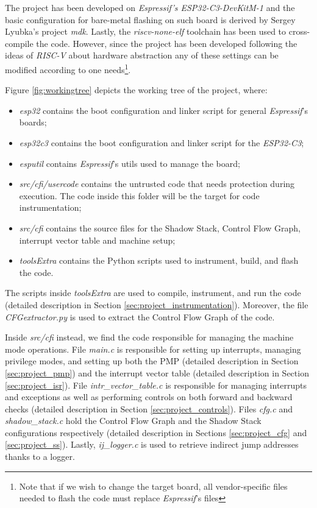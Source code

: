 The project has been developed on \textit{Espressif's ESP32-C3-DevKitM-1}
\cite{esp32c3} and the basic configuration for bare-metal flashing on such board
is derived by Sergey Lyubka's project \textit{mdk}\cite{mdk}. Lastly, the
\textit{riscv-none-elf}\cite{toolchain} toolchain has been used to cross-compile
the code. However, since the project has been developed following the ideas of
\textit{RISC-V} about hardware abstraction any of these settings can be modified
according to one needs\footnote{Note that if we wish to change the target board,
all vendor-specific files needed to flash the code must replace \textit{Espressif}'s
files}.

Figure \ref{fig:workingtree} depicts the working tree of the project, where:
\begin{itemize}
  \item \textit{esp32} contains the boot configuration and linker script for
    general \textit{Espressif}'s boards;

  \item \textit{esp32c3} contains the boot configuration and linker script for
    the \textit{ESP32-C3};

  \item \textit{esputil} contains \textit{Espressif}'s utils used to manage the board;

  \item \textit{src/cfi/usercode} contains the untrusted code that needs
    protection during execution. The code inside this folder will be the target for
    code instrumentation;

  \item \textit{src/cfi} contains the source files for the Shadow Stack, Control
    Flow Graph, interrupt vector table and machine setup;

  \item \textit{toolsExtra} contains the Python scripts used to instrument, build,
    and flash the code.
\end{itemize}

The scripts inside \textit{toolsExtra} are used to compile, instrument, and run
the code (detailed description in Section \ref{sec:project_instrumentation}). Moreover,
the file \textit{CFGextractor.py} is used to extract the Control Flow Graph of the
code.

Inside \textit{src/cfi} instead, we find the code responsible for managing the machine
mode operations. File \textit{main.c} is responsible for setting up interrupts,
managing privilege modes, and setting up both the PMP (detailed description in
Section \ref{sec:project_pmp}) and the interrupt vector table (detailed
description in Section \ref{sec:project_isr}). File \textit{intr\_vector\_table.c}
is responsible for managing interrupts and exceptions as well as performing controls
on both forward and backward checks (detailed description in Section
\ref{sec:project_controls}). Files \textit{cfg.c} and \textit{shadow\_stack.c}
hold the Control Flow Graph and the Shadow Stack configurations respectively (detailed
description in Sections \ref{sec:project_cfg} and \ref{sec:project_ss}). Lastly,
\textit{ij\_logger.c} is used to retrieve indirect jump addresses thanks to a logger.


